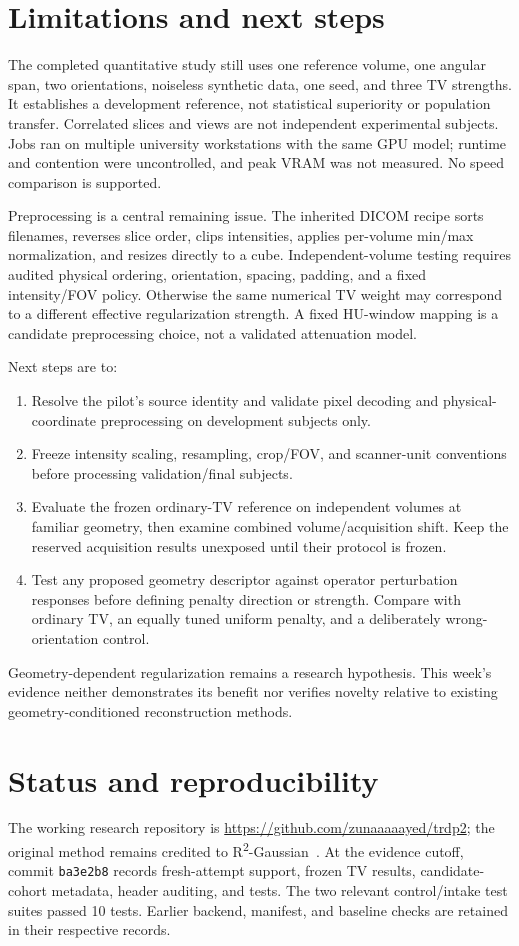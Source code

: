 \documentclass[10pt,a4paper]{article}
\newcommand{\Rtwo}{R\textsuperscript{2}-Gaussian}
\begin{document}
\section{Limitations and next steps}
The completed quantitative study still uses one reference volume, one angular span, two orientations, noiseless synthetic data, one seed, and three TV strengths. It establishes a development reference, not statistical superiority or population transfer. Correlated slices and views are not independent experimental subjects. Jobs ran on multiple university workstations with the same GPU model; runtime and contention were uncontrolled, and peak VRAM was not measured. No speed comparison is supported.

Preprocessing is a central remaining issue. The inherited DICOM recipe sorts filenames, reverses slice order, clips intensities, applies per-volume min/max normalization, and resizes directly to a cube. Independent-volume testing requires audited physical ordering, orientation, spacing, padding, and a fixed intensity/FOV policy. Otherwise the same numerical TV weight may correspond to a different effective regularization strength. A fixed HU-window mapping is a candidate preprocessing choice, not a validated attenuation model.

Next steps are to:
\begin{enumerate}
\item Resolve the pilot's source identity and validate pixel decoding and physical-coordinate preprocessing on development subjects only.
\item Freeze intensity scaling, resampling, crop/FOV, and scanner-unit conventions before processing validation/final subjects.
\item Evaluate the frozen ordinary-TV reference on independent volumes at familiar geometry, then examine combined volume/acquisition shift. Keep the reserved acquisition results unexposed until their protocol is frozen.
\item Test any proposed geometry descriptor against operator perturbation responses before defining penalty direction or strength. Compare with ordinary TV, an equally tuned uniform penalty, and a deliberately wrong-orientation control.
\end{enumerate}
Geometry-dependent regularization remains a research hypothesis. This week's evidence neither demonstrates its benefit nor verifies novelty relative to existing geometry-conditioned reconstruction methods.

\section{Status and reproducibility}
The working research repository is \url{https://github.com/zunaaaaayed/trdp2}; the original method remains credited to \Rtwo\ \cite{r2,upstream}. At the evidence cutoff, commit \texttt{ba3e2b8} records fresh-attempt support, frozen TV results, candidate-cohort metadata, header auditing, and tests. The two relevant control/intake test suites passed 10 tests. Earlier backend, manifest, and baseline checks are retained in their respective records.
\end{document}
